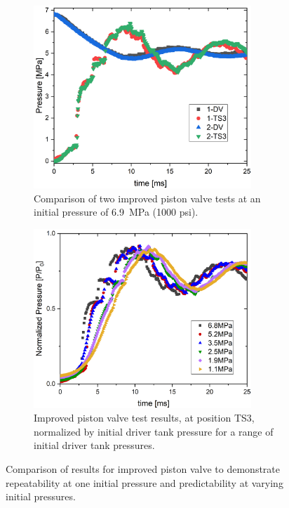 \begin{figure}[tb]
    \centering
    \begin{subfigure}[t]{0.45\textwidth}
        \centering
        \includegraphics[width=0.9\textwidth]{results/plots/1000psi_FFKM_Piston_2.png}
        \caption{Comparison of two improved piston valve tests at an initial pressure of \SI{6.9}{\mega\pascal} (1000 psi).}
        \label{fig:new piston 2 test}
    \end{subfigure}
    \hfill
    \begin{subfigure}[t]{0.45\textwidth}
        \centering
        \includegraphics[width=0.9\textwidth]{results/plots/Normalized_TS3_oring.png}
        \caption{Improved piston valve test results, at position TS3, normalized by initial driver tank pressure for a range of initial driver tank pressures.}
        \label{fig:new norm}
    \end{subfigure}
    \caption{Comparison of results for improved piston valve to demonstrate repeatability at one initial pressure and predictability at varying initial pressures.}
    \label{fig:new piston repeatability}
\end{figure}

